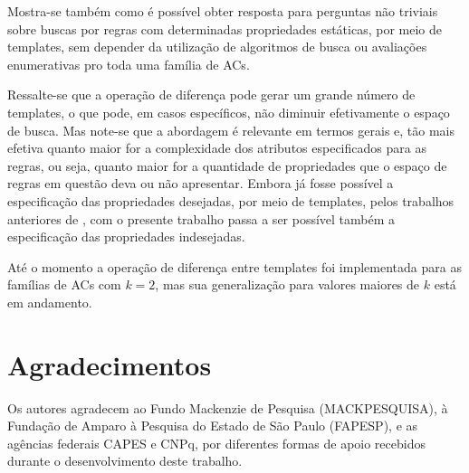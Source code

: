 \documentclass[12pt, a4paper]{article}
\begin{document}
Mostra-se também como é possível obter resposta para perguntas não triviais sobre buscas por regras com determinadas propriedades estáticas, por meio de templates, sem depender da utilização de algoritmos de busca ou avaliações  enumerativas pro toda uma família de ACs.

Ressalte-se que a operação de diferença pode gerar um grande número de templates, o que pode, em casos específicos, não diminuir efetivamente o espaço de busca. Mas note-se que a abordagem é relevante em termos gerais e, tão mais efetiva quanto maior for a complexidade dos atributos especificados para as regras, ou seja, quanto maior for a quantidade de propriedades que o espaço de regras em questão deva ou não apresentar. Embora já fosse possível a especificação das propriedades desejadas, por meio de templates, pelos trabalhos anteriores de \cite{deOliveira2014,deOliveira2014b}%
, com o presente trabalho passa a ser possível também a especificação das propriedades indesejadas.

Até o momento a operação de diferença entre templates foi implementada para as famílias de ACs com $k=2$, mas sua generalização para valores maiores de $k$ está em andamento.

\section*{Agradecimentos}
\label{sec:agrdecimentos}
Os autores agradecem ao Fundo Mackenzie de Pesquisa (MACKPESQUISA), à Fundação de Amparo à Pesquisa do Estado de São Paulo (FAPESP), e as agências federais CAPES e CNPq, por diferentes formas de apoio recebidos durante o desenvolvimento deste trabalho.

\def\refname{REFERÊNCIAS BIBLIOGRÁFICAS}


\end{document}

